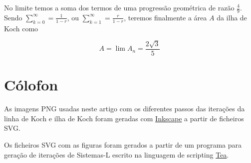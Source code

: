 \documentclass[11pt]{article}
\begin{document}
No limite temos a soma dos termos de uma progressão geométrica de
razão $\frac{4}{9}$. Sendo $\sum_{k=0}^\infty = \frac{1}{1-r}$, ou
$\sum_{k=1}^\infty = \frac{r}{1-r}$, teremos finalmente a área $A$ da
ilha de Koch como

\[
A = \lim A_n = \frac{2\sqrt{3}}{5}
\]





\section*{Cólofon}

As imagens PNG usadas neste artigo com os diferentes passos das
iterações da linha de Koch e ilha de Koch foram geradas com
\href{http://www.inkscape.org/}{Inkscape} a partir de ficheiros SVG.

Os ficheiros SVG com as figuras foram gerados a partir de um programa
para geração de iterações de Sistemas-L escrito na linguagem de
scripting \href{http://www.pdmfc.com/tea-site/info/index.html}{Tea}.

  
\end{document}
